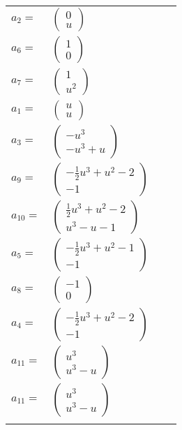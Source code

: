 \documentclass[1p]{elsarticle_modified}
\theoremstyle{definition}
\begin{document}
\begin{tabular}{m{7pt} m{180pt} m{7pt} m{180pt} }
\flushright $a_{2}=$&$\begin{pmatrix}0\\u\end{pmatrix}$ \\
\flushright $a_{6}=$&$\begin{pmatrix}1\\0\end{pmatrix}$ \\
\flushright $a_{7}=$&$\begin{pmatrix}1\\u^2\end{pmatrix}$ \\
\flushright $a_{1}=$&$\begin{pmatrix}u\\u\end{pmatrix}$ \\
\flushright $a_{3}=$&$\begin{pmatrix}- u^3\\- u^3+u\end{pmatrix}$ \\
\flushright $a_{9}=$&$\begin{pmatrix}-\frac{1}{2} u^3+u^2-2\\-1\end{pmatrix}$ \\
\flushright $a_{10}=$&$\begin{pmatrix}\frac{1}{2} u^3+u^2-2\\u^3- u-1\end{pmatrix}$ \\
\flushright $a_{5}=$&$\begin{pmatrix}-\frac{1}{2} u^3+u^2-1\\-1\end{pmatrix}$ \\
\flushright $a_{8}=$&$\begin{pmatrix}-1\\0\end{pmatrix}$ \\
\flushright $a_{4}=$&$\begin{pmatrix}-\frac{1}{2} u^3+u^2-2\\-1\end{pmatrix}$ \\
\flushright $a_{11}=$&$\begin{pmatrix}u^3\\u^3- u\end{pmatrix}$\\ \flushright $a_{11}=$&$\begin{pmatrix}u^3\\u^3- u\end{pmatrix}$\\&\end{tabular}
\end{document}
